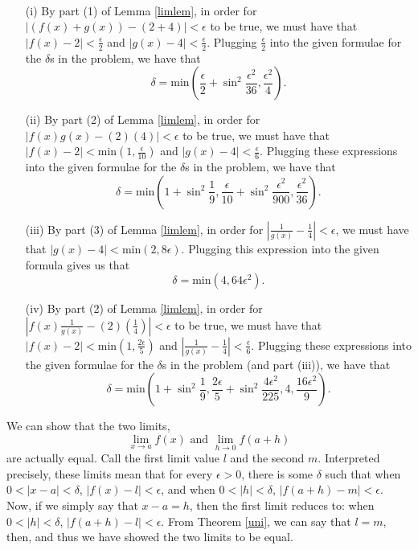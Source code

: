 \begin{problem}[5-6] \ 
\begin{enumerate}
\item[(i)]
By part (1) of Lemma \ref{limlem}, in order for $|(f(x) + g(x)) - (2 + 4)| < \epsilon$ to be true, we must have that $|f(x) - 2| < \frac{\epsilon}{2}$ and $|g(x) - 4| < \frac{\epsilon}{2}$. Plugging $\frac{\epsilon}{2}$ into the given formulae for the $\delta$s in the problem, we have that
\[ \delta = \textrm{min}\left(\frac{\epsilon}{2} + \sin^2\frac{\epsilon^2}{36}, \frac{\epsilon^2}{4}\right). \]

\item[(ii)]
By part (2) of Lemma \ref{limlem}, in order for $|f(x)g(x) - (2)(4)| < \epsilon$ to be true, we must have that $|f(x) - 2| < \textrm{min}\left(1, \frac{\epsilon}{10}\right)$ and $|g(x) - 4| < \frac{\epsilon}{6}$. Plugging these expressions into the given formulae for the $\delta$s in the problem, we have that
\[ \delta = \textrm{min}\left(1 + \sin^2 \frac{1}{9}, \frac{\epsilon}{10} + \sin^2 \frac{\epsilon^2}{900}, \frac{\epsilon^2}{36}\right). \]

\item[(iii)]
By part (3) of Lemma \ref{limlem}, in order for $|\frac{1}{g(x)} - \frac{1}{4}| < \epsilon$, we must have that $|g(x) - 4| < \textrm{min}(2, 8\epsilon)$. Plugging this expression into the given formula gives us that
\[ \delta = \textrm{min}(4, 64\epsilon^2). \]

\item[(iv)]
By part (2) of Lemma \ref{limlem}, in order for $|f(x)\frac{1}{g(x)} - (2)(\frac{1}{4})| < \epsilon$ to be true, we must have that $|f(x) - 2| < \textrm{min}\left(1, \frac{2\epsilon}{5}\right)$ and $|\frac{1}{g(x)} - \frac{1}{4}| < \frac{\epsilon}{6}$. Plugging these expressions into the given formulae for the $\delta$s in the problem (and part (iii)), we have that
\[ \delta = \textrm{min}\left(1 + \sin^2 \frac{1}{9}, \frac{2\epsilon}{5} + \sin^2 \frac{4\epsilon^2}{225}, 4, \frac{16\epsilon^2}{9}\right). \]
\end{enumerate}
\end{problem}

\begin{problem}[5-9]
We can show that the two limits,
\[ \lim_{x \to a} f(x) \textrm{ and } \lim_{h \to 0} f(a + h) \]
are actually equal. Call the first limit value $l$ and the second $m$. Interpreted precisely, these limits mean that for every $\epsilon > 0$, there is some $\delta$ such that when $0 < |x - a| < \delta$, $|f(x) - l| < \epsilon$, and when $0 < |h| < \delta$, $|f(a + h) - m| < \epsilon$. Now, if we simply say that $x - a = h$, then the first limit reduces to: when $0 < |h| < \delta$, $|f(a + h) - l| < \epsilon$. From Theorem \ref{uni}, we can say that $l = m$, then, and thus we have showed the two limits to be equal.
\end{problem}

